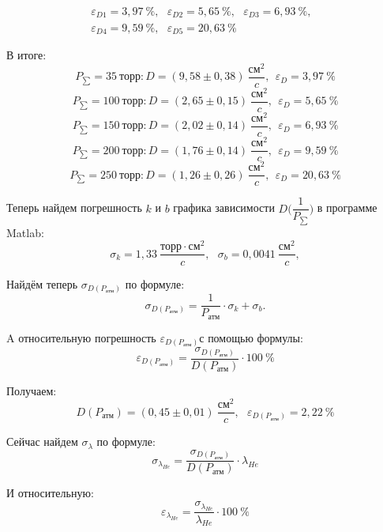 \documentclass[a4paper,12pt]{article}
\begin{document}
\begin{multline}
	\varepsilon_{D1} = 3,97\ \%,~~~\varepsilon_{D2} = 5,65\ \%,~~~\varepsilon_{D3} = 6,93\ \%,~~~\\
	\varepsilon_{D4} = 9,59\ \%,~~~\varepsilon_{D5} = 20,63\ \%~~~
\end{multline}

В итоге:
\[P_{\sum} = 35 \ \text{торр}: D = (9,58 \pm 0,38)\  \frac{\text{см}^2}{c}, \ ~ \varepsilon_{D} = 3,97\ \%\]
\[P_{\sum} = 100\ \text{торр}: D = (2,65 \pm 0,15)\  \frac{\text{см}^2}{c}, \ ~ \varepsilon_{D} = 5,65\ \%\]
\[P_{\sum} = 150\ \text{торр}: D = (2,02 \pm 0,14)\  \frac{\text{см}^2}{c}, \ ~ \varepsilon_{D} = 6,93\ \%\]
\[P_{\sum} = 200\ \text{торр}: D = (1,76 \pm 0,14)\  \frac{\text{см}^2}{c}, \ ~ \varepsilon_{D} = 9,59\ \%\]
\[P_{\sum} = 250\ \text{торр}: D = (1,26 \pm 0,26)\  \frac{\text{см}^2}{c}, \ ~ \varepsilon_{D} = 20,63\ \%\]

Теперь найдем погрешность $k$ и $b$ графика зависимости $D\bigg(\dfrac{1}{P_{\sum}}\bigg)$ в программе Matlab:
\begin{equation}
	\sigma_k = 1,33 \ \frac{\text{торр}\cdot \text{см}^2}{c}, \ ~ \ \sigma_b = 0,0041 \ \frac{\text{см}^2}{c},
\end{equation}

Найдём теперь $\sigma_{D(P_{\text{атм}})}$ по формуле:
\begin{equation}
	\sigma_{D(P_{\text{атм}})} = \dfrac{1}{P_{\text{атм}}} \cdot \sigma_k + \sigma_b.
\end{equation}

A относительную погрешность $\varepsilon_{D(P_{\text{атм}})}$с помощью формулы:
\begin{equation}
	\varepsilon_{D(P_{\text{атм}})} = \dfrac{\sigma_{D(P_{\text{атм}})}}{D(P_{\text{атм}})}\cdot 100\ \%
\end{equation}

Получаем:
\begin{equation}
	D(P_{\text{атм}}) = (0,45 \pm 0,01)\ \frac{\text{см}^2}{c}, \ ~ \ \varepsilon_{D(P_{\text{атм}})} = 2,22\ \%
\end{equation}

Сейчас найдем $\sigma_{\lambda}$ по формуле:
\begin{equation}
	\sigma_{\lambda_{He}} = \dfrac{\sigma_{D(P_{\text{атм}})}}{D(P_{\text{атм}})} \cdot \lambda_{He}
\end{equation}

И относительную:
\begin{equation}
	\varepsilon_{\lambda_{He}} = \dfrac{\sigma_{\lambda_{He}}}{\lambda_{He}}\cdot 100\ \%
\end{equation}
\end{document}
